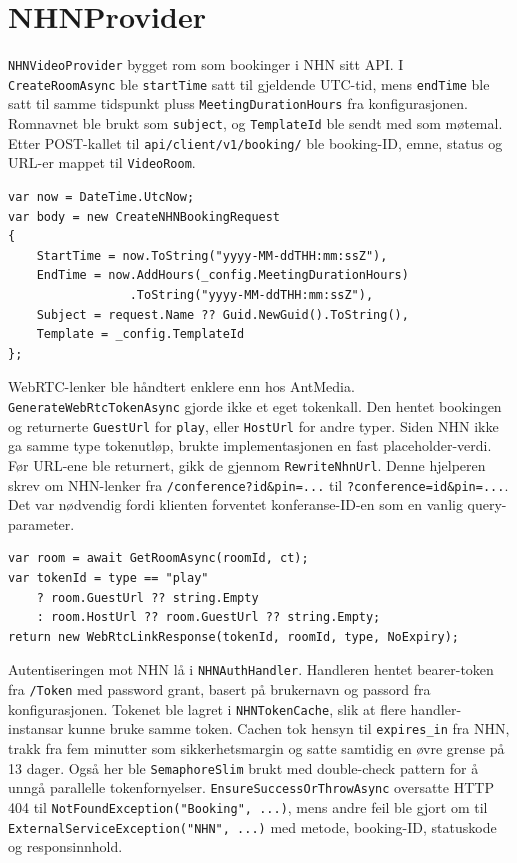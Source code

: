 \section{NHNProvider}
\label{sec:NHN-provider}
\texttt{NHNVideoProvider} bygget rom som bookinger i NHN sitt API. I \texttt{CreateRoomAsync} ble \texttt{startTime} satt til gjeldende UTC-tid, mens \texttt{endTime} ble satt til samme tidspunkt pluss \texttt{MeetingDurationHours} fra konfigurasjonen. Romnavnet ble brukt som \texttt{subject}, og \texttt{TemplateId} ble sendt med som møtemal. Etter POST-kallet til \texttt{api/client/v1/booking/} ble booking-ID, emne, status og URL-er mappet til \texttt{VideoRoom}.

\begin{lstlisting}[language={[Sharp]C}, label=lst:nhn-create-room]
var now = DateTime.UtcNow;
var body = new CreateNHNBookingRequest
{
    StartTime = now.ToString("yyyy-MM-ddTHH:mm:ssZ"),
    EndTime = now.AddHours(_config.MeetingDurationHours)
                 .ToString("yyyy-MM-ddTHH:mm:ssZ"),
    Subject = request.Name ?? Guid.NewGuid().ToString(),
    Template = _config.TemplateId
};
\end{lstlisting}

WebRTC-lenker ble håndtert enklere enn hos AntMedia. \texttt{GenerateWebRtcTokenAsync} gjorde ikke et eget tokenkall. Den hentet bookingen og returnerte \texttt{GuestUrl} for \texttt{play}, eller \texttt{HostUrl} for andre typer. Siden NHN ikke ga samme type tokenutløp, brukte implementasjonen en fast placeholder-verdi. Før URL-ene ble returnert, gikk de gjennom \texttt{RewriteNhnUrl}. Denne hjelperen skrev om NHN-lenker fra \texttt{/conference?id\&pin=...} til \texttt{?conference=id\&pin=...}. Det var nødvendig fordi klienten forventet konferanse-ID-en som en vanlig query-parameter.

\begin{lstlisting}[language={[Sharp]C}, label=lst:nhn-webrtc]
var room = await GetRoomAsync(roomId, ct);
var tokenId = type == "play"
    ? room.GuestUrl ?? string.Empty
    : room.HostUrl ?? room.GuestUrl ?? string.Empty;
return new WebRtcLinkResponse(tokenId, roomId, type, NoExpiry);
\end{lstlisting}

Autentiseringen mot NHN lå i \texttt{NHNAuthHandler}. Handleren hentet bearer-token fra \texttt{/Token} med password grant, basert på brukernavn og passord fra konfigurasjonen. Tokenet ble lagret i \texttt{NHNTokenCache}, slik at flere handler-instansar kunne bruke samme token. Cachen tok hensyn til \texttt{expires\_in} fra NHN, trakk fra fem minutter som sikkerhetsmargin og satte samtidig en øvre grense på 13 dager. Også her ble \texttt{SemaphoreSlim} brukt med double-check pattern for å unngå parallelle tokenfornyelser. \texttt{EnsureSuccessOrThrowAsync} oversatte HTTP 404 til \texttt{NotFoundException("Booking", ...)}, mens andre feil ble gjort om til \texttt{ExternalServiceException("NHN", ...)} med metode, booking-ID, statuskode og responsinnhold.

